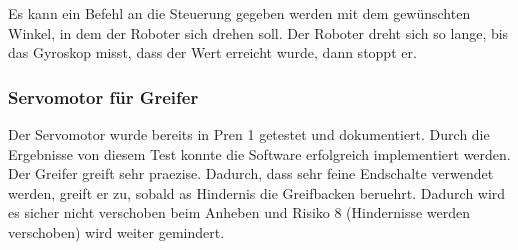 Es kann ein Befehl an die Steuerung gegeben werden mit dem gewünschten Winkel, in dem der Roboter sich drehen soll. Der Roboter dreht sich so lange, bis das Gyroskop misst, dass der Wert erreicht wurde, dann stoppt er.


\subsubsection{Servomotor für Greifer} 
\label{hindernis-um-greifer}

Der Servomotor wurde bereits in Pren 1 getestet und dokumentiert. Durch die Ergebnisse von diesem Test konnte die Software erfolgreich implementiert werden. Der Greifer greift sehr praezise. Dadurch, dass sehr feine Endschalte verwendet werden, greift er zu, sobald as Hindernis die Greifbacken beruehrt. Dadurch wird es sicher nicht verschoben beim Anheben und Risiko 8 (Hindernisse werden verschoben) wird weiter gemindert.


